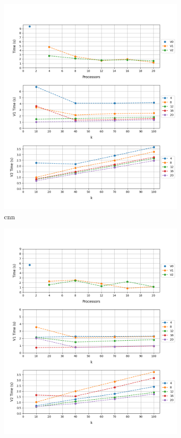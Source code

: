 \documentclass[12pt, a4paper]{article}
\begin{document}
\begin{figure}[h!]
\begin{subfigure}[b]{0.33\textwidth}
         \includegraphics[height=.4\textheight, width=\textwidth, keepaspectratio]{assets/tv/cnn.png}
         \caption{cnn}
     \end{subfigure}
     \begin{subfigure}[b]{0.33\textwidth}
         \centering
         \includegraphics[height=.4\textheight, width=\textwidth, keepaspectratio]{assets/tv/ndtv.png}

\end{subfigure}
\end{figure}
\end{document}
